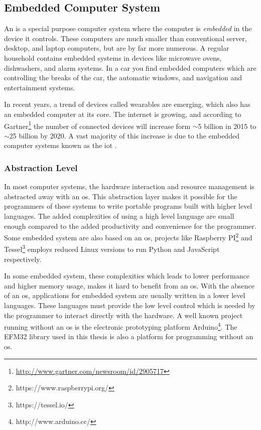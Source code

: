 
\subsection{Embedded Computer System}
An  is a special purpose computer system where the computer is \emph{embedded} in the device it controls.
These computers are much smaller than conventional server, desktop, and laptop computers, but are by far more numerous.
A regular household contains embedded systems in devices like microwave ovens, dishwashers, and alarm systems.
In a car you find embedded computers which are controlling the breaks of the car, the automatic windows, and navigation and entertainment systems.

In recent years, a trend of devices called wearables are emerging, which also has an embedded computer at its core.
The internet is growing, and according to Gartner\footnote{\url{http://www.gartner.com/newsroom/id/2905717}} the number of connected devices will increase form $\sim$5 billion in 2015 to $\sim$25 billion by 2020.
A vast majority of this increase is due to the embedded computer systems known as the \gls{iot} \cite{Valhouli2010}.

\subsubsection{Abstraction Level}
In most computer systems, the hardware interaction and resource management is abstracted away with an \gls{os}.
This abstraction layer makes it possible for the programmers of these systems to write portable programs built with higher level languages.
The added complexities of using a high level language are small enough compared to the added productivity and convenience for the programmer.
Some embedded system are also based on an \gls{os}, projects like Raspberry PI\footnote{https://www.raspberrypi.org/} and Tessel\footnote{https://tessel.io/} employs reduced Linux versions to run Python and JavaScript respectively.

In some embedded system, these complexities which leads to lower performance and higher memory usage, makes it hard to benefit from an \gls{os}.
With the absence of an \gls{os}, applications for embedded system are usually written in a lower level languages.
These languages must provide the low level control which is needed by the programmer to interact directly with the hardware.
A well known project running without an \gls{os} is the electronic prototyping platform Arduino\footnote{http://www.arduino.cc/}.
The EFM32 {\emlib} library used in this thesis is also a platform for {\C} programming without an \gls{os}.


